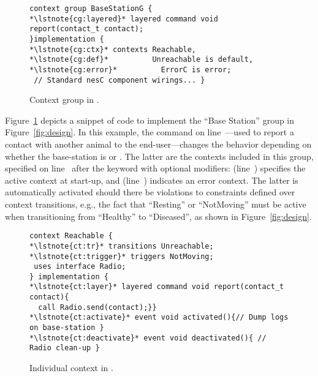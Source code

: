 \begin{figure}[!tb]
\begin{lstlisting}[style=conescframe]
context group BaseStationG {
*\lstnote{cg:layered}* layered command void report(contact_t contact);
}implementation {
*\lstnote{cg:ctx}* contexts Reachable, 
*\lstnote{cg:def}*          Unreachable is default,
*\lstnote{cg:error}*          ErrorC is error;
 // Standard nesC component wirings... }
\end{lstlisting}
\vspace{-5mm}
\caption{Context group in \conesc.}
  \label{fig:configuration}
\vspace{-3mm}
\end{figure}

Figure~\ref{fig:configuration} depicts a snippet of \conesc code to
implement the ``Base Station'' group in Figure~\ref{fig:design}. In
this example, the  command on
line~---used to report a contact with another animal
to the end-user---changes the behavior depending on whether the
base-station is  or . The latter are
the contexts included in this group, specified on line~
after the keyword  with optional modifiers:  (line~) specifies the active context at
start-up, and  (line~) indicates an
error context. The latter is automatically activated should there be
violations to constraints defined over context transitions, e.g., the
fact that ``Resting'' or ``NotMoving'' must be active when
transitioning from ``Healthy'' to ``Diseased'', as shown in
Figure~\ref{fig:design}.

\begin{figure}[!tb]
\begin{lstlisting}[style=conescframe]
context Reachable {
*\lstnote{ct:tr}* transitions Unreachable;
*\lstnote{ct:trigger}* triggers NotMoving;
 uses interface Radio;
} implementation {
*\lstnote{ct:layer}* layered command void report(contact_t contact){
  call Radio.send(contact);}}
*\lstnote{ct:activate}* event void activated(){// Dump logs on base-station }
*\lstnote{ct:deactivate}* event void deactivated(){ // Radio clean-up }
\end{lstlisting}
\vspace{-5mm}
\caption{Individual context in \conesc.}
  \label{fig:context}
\vspace{-5mm}
\end{figure}

